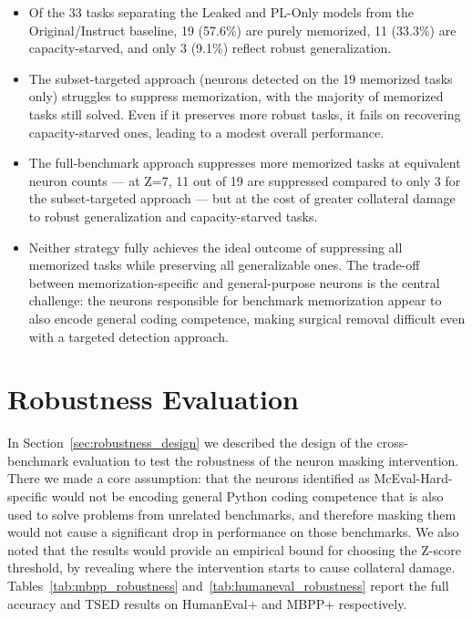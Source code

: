 \documentclass[mscthesis]{usiinfthesis}
\begin{document}
\begin{tcolorbox}[
  colback=blue!5!white,
  colframe=blue!40!black,
  title=\textbf{Findings — Memorization Analysis},
  fonttitle=\bfseries,
  rounded corners,
  arc=4pt
]
\begin{itemize}
  \item Of the 33 tasks separating the Leaked and PL-Only models from the Original/Instruct
  baseline, 19 (57.6\%) are purely memorized, 11 (33.3\%) are capacity-starved, and only
  3 (9.1\%) reflect robust generalization.

  \item The subset-targeted approach (neurons detected on the 19 memorized tasks only) struggles
    to suppress memorization, with the majority of memorized tasks still solved.
    Even if it preserves more robust tasks, it fails on recovering capacity-starved ones, leading to
    a modest overall performance.

  \item The full-benchmark approach suppresses more memorized tasks at equivalent neuron
  counts — at Z=7, 11 out of 19 are suppressed compared to only 3 for the subset-targeted
  approach — but at the cost of greater collateral damage to robust generalization and
  capacity-starved tasks.

  \item Neither strategy fully achieves the ideal outcome of suppressing all memorized tasks
  while preserving all generalizable ones. The trade-off between memorization-specific and
  general-purpose neurons is the central challenge: the neurons responsible for benchmark
  memorization appear to also encode general coding competence, making surgical removal
  difficult even with a targeted detection approach.
\end{itemize}
\end{tcolorbox}

\section{Robustness Evaluation}
In Section~\ref{sec:robustness_design} we described the design of the cross-benchmark evaluation to test the robustness of the neuron masking intervention.
There we made a core assumption: that the neurons identified as McEval-Hard-specific would not be encoding general Python coding competence that is also used to solve problems from unrelated benchmarks, and therefore masking them would not cause a significant drop in performance on those benchmarks.
We also noted that the results would provide an empirical bound for choosing the Z-score threshold, by revealing where the intervention starts to cause collateral damage. 
Tables~\ref{tab:mbpp_robustness} and~\ref{tab:humaneval_robustness}
report the full accuracy and TSED results on HumanEval+ and MBPP+ respectively.
\end{document}
